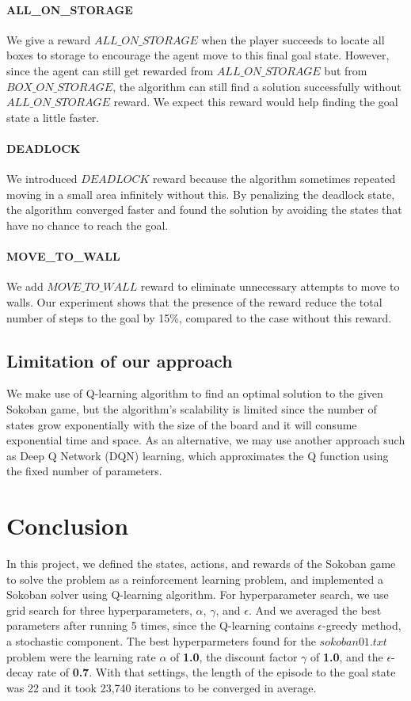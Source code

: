 \documentclass{article}
\begin{document}
\paragraph{ALL\_ON\_STORAGE}
We give a reward $ALL\_ON\_STORAGE$ when the player succeeds to locate all boxes to storage to encourage the agent move to this final goal state. However, since the agent can still get rewarded from $ALL\_ON\_STORAGE$ but from $BOX\_ON\_STORAGE$, the algorithm can still find a solution successfully without $ALL\_ON\_STORAGE$ reward. We expect this reward would help finding the goal state a little faster.

\paragraph{DEADLOCK}
We introduced $DEADLOCK$ reward because the algorithm sometimes repeated moving in a small area infinitely without this. By penalizing the deadlock state, the algorithm converged faster and found the solution by avoiding the states that have no chance to reach the goal.

\paragraph{MOVE\_TO\_WALL}
We add $MOVE\_TO\_WALL$ reward to eliminate unnecessary attempts to move to walls. Our experiment shows that the presence of the reward reduce the total number of steps to the goal by 15\%, compared to the case without this reward.

\subsection{Limitation of our approach}
We make use of Q-learning algorithm to find an optimal solution to the given Sokoban game, but the algorithm's scalability is limited since the number of states grow exponentially with the size of the board and it will consume exponential time and space. As an alternative, we may use another approach such as Deep Q Network (DQN) learning, which approximates the Q function using the fixed number of parameters.

\section{Conclusion}
In this project, we defined the states, actions, and rewards of the Sokoban game to solve the problem as a reinforcement learning problem, and implemented a Sokoban solver using Q-learning algorithm. For hyperparameter search, we use grid search for three hyperparameters, $\alpha$, $\gamma$, and $\epsilon$. And we averaged the best parameters after running 5 times, since the Q-learning contains $\epsilon$-greedy method, a stochastic component. The best hyperparmeters found for the $sokoban01.txt$ problem were the learning rate $\alpha$ of \textbf{1.0}, the discount factor $\gamma$ of \textbf{1.0}, and the $\epsilon$-decay rate of \textbf{0.7}. With that settings, the length of the episode to the goal state was 22 and it took 23,740 iterations to be converged in average.
\end{document}

